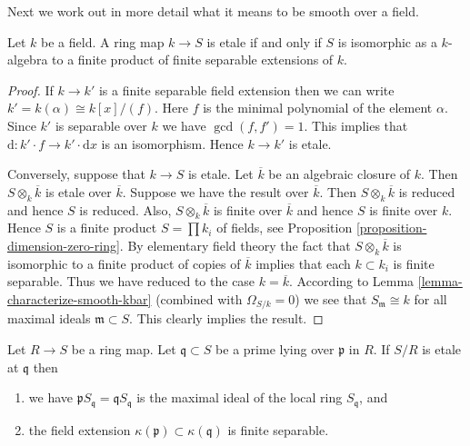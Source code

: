 \noindent
Next we work out in more detail what it means to be smooth
over a field.

\begin{lemma}
\label{lemma-etale-over-field}
Let $k$ be a field. A ring map $k \to S$ is etale if and only if $S$
is isomorphic as a $k$-algebra to a finite product of finite separable
extensions of $k$.
\end{lemma}

\begin{proof}
If $k \to k'$ is a finite separable field extension then we can
write $k' = k(\alpha) \cong k[x]/(f)$. Here $f$ is the minimal
polynomial of the element $\alpha$. Since $k'$ is separable over $k$
we have $\gcd(f, f') = 1$. This
implies that $\text{d} : k'\cdot f \to k' \cdot \text{d}x$
is an isomorphism. Hence $k \to k'$ is etale.

\medskip\noindent
Conversely, suppose that $k \to S$ is etale. Let $\overline{k}$
be an algebraic closure of $k$. Then $S \otimes_k \overline{k}$
is etale over $\overline{k}$. Suppose we have the result over $\overline{k}$.
Then $S \otimes_k \overline{k}$ is reduced and hence $S$ is reduced.
Also, $S \otimes_k \overline{k}$ is finite over $\overline{k}$
and hence $S$ is finite over $k$. Hence $S$ is a finite product
$S = \prod k_i$
of fields, see Proposition \ref{proposition-dimension-zero-ring}.
By elementary field theory the fact that $S \otimes_k \overline{k}$
is isomorphic to a finite product of copies of $\overline{k}$
implies that each $k \subset k_i$ is finite separable.
Thus we have reduced to the case $k = \overline{k}$. According to
Lemma \ref{lemma-characterize-smooth-kbar} (combined with
$\Omega_{S/k} = 0$) we see that $S_{\mathfrak m} \cong k$
for all maximal ideals $\mathfrak m \subset S$. This clearly
implies the result.
\end{proof}

\begin{lemma}
\label{lemma-etale-at-prime}
Let $R \to S$ be a ring map.
Let $\mathfrak q \subset S$ be a prime lying over $\mathfrak p$ in $R$.
If $S/R$ is etale at $\mathfrak q$ then
\begin{enumerate}
\item we have $\mathfrak p S_{\mathfrak q} = \mathfrak qS_{\mathfrak q}$
is the maximal ideal of the local ring $S_{\mathfrak q}$, and
\item the field extension $\kappa(\mathfrak p) \subset \kappa(\mathfrak q)$
is finite separable.
\end{enumerate}
\end{lemma}

